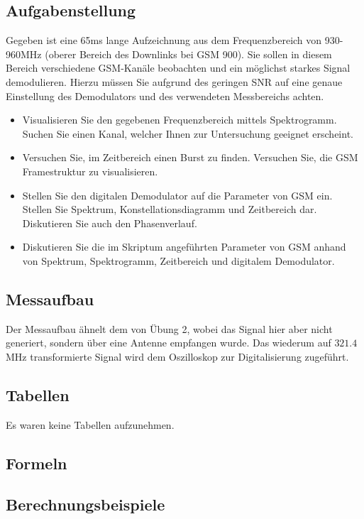 \documentclass[12pt,a4paper,ngerman]{article}
\begin{document}
\subsection{Aufgabenstellung}
Gegeben ist eine 65ms lange Aufzeichnung aus dem Frequenzbereich von 930-960MHz (oberer Bereich des Downlinks bei GSM 900). Sie sollen in diesem Bereich verschiedene GSM-Kanäle beobachten und ein möglichst starkes Signal demodulieren. Hierzu müssen Sie aufgrund des geringen SNR auf eine genaue Einstellung des Demodulators und des verwendeten Messbereichs achten. 
\begin{itemize}
\item Visualisieren Sie den gegebenen Frequenzbereich mittels Spektrogramm. Suchen Sie einen Kanal, welcher Ihnen zur Untersuchung geeignet erscheint.
\item Versuchen Sie, im Zeitbereich einen Burst zu finden. Versuchen Sie, die GSM Framestruktur zu visualisieren.
\item Stellen Sie den digitalen Demodulator auf die Parameter von GSM ein. Stellen Sie Spektrum, Konstellationsdiagramm und Zeitbereich dar. Diskutieren Sie auch den Phasenverlauf. 
\item Diskutieren Sie die im Skriptum angeführten Parameter von GSM anhand von Spektrum, Spektrogramm, Zeitbereich und digitalem Demodulator. 
\end{itemize}

\subsection{Messaufbau}
Der Messaufbau ähnelt dem von Übung 2, wobei das Signal hier aber nicht generiert, sondern über eine Antenne empfangen wurde. Das wiederum auf $321.4$MHz transformierte Signal wird dem Oszilloskop zur Digitalisierung zugeführt. 
\subsection{Tabellen}
Es waren keine Tabellen aufzunehmen. 
\subsection{Formeln}

\subsection{Berechnungsbeispiele}
\pagebreak
\end{document}
